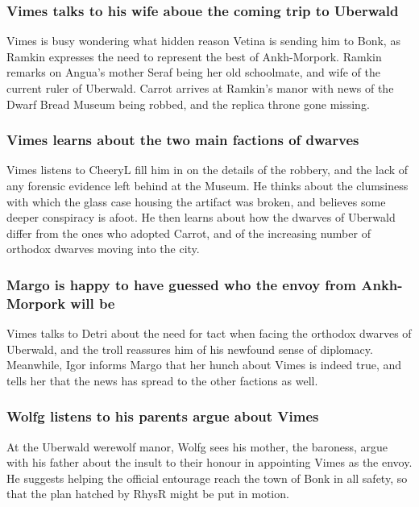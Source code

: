 \subsubsection{\Gls{Vimes} talks to his wife aboue the coming trip to Uberwald}
\Gls{Vimes} is busy wondering what hidden reason \Gls{Vetina} is sending him to Bonk, as
\Gls{Ramkin} expresses the need to represent the best of Ankh-Morpork. \Gls{Ramkin} remarks on
\Gls{Angua}'s mother \Gls{Seraf} being her old schoolmate, and wife of the current ruler of
Uberwald. \Gls{Carrot} arrives at \Gls{Ramkin}'s manor with news of the Dwarf Bread Museum being
robbed, and the replica throne gone missing.

\subsubsection{\Gls{Vimes} learns about the two main factions of dwarves}
\Gls{Vimes} listens to \Gls{CheeryL} fill him in on the details of the robbery, and the lack of any
forensic evidence left behind at the Museum. He thinks about the clumsiness with which the glass
case housing the artifact was broken, and believes some deeper conspiracy is afoot. He then learns
about how the dwarves of Uberwald differ from the ones who adopted \Gls{Carrot}, and of the
increasing number of orthodox dwarves moving into the city.

\subsubsection{\Gls{Margo} is happy to have guessed who the envoy from Ankh-Morpork will be}
\Gls{Vimes} talks to \Gls{Detri} about the need for tact when facing the orthodox dwarves of
Uberwald, and the troll reassures him of his newfound sense of diplomacy. Meanwhile, \Gls{Igor}
informs \Gls{Margo} that her hunch about \Gls{Vimes} is indeed true, and tells her that the news
has spread to the other factions as well.

\subsubsection{\Gls{Wolfg} listens to his parents argue about \Gls{Vimes}}
At the Uberwald werewolf manor, \Gls{Wolfg} sees his mother, the baroness, argue with his father
about the insult to their honour in appointing \Gls{Vimes} as the envoy. He suggests helping the
official entourage reach the town of Bonk in all safety, so that the plan hatched by \Gls{RhysR}
might be put in motion.

